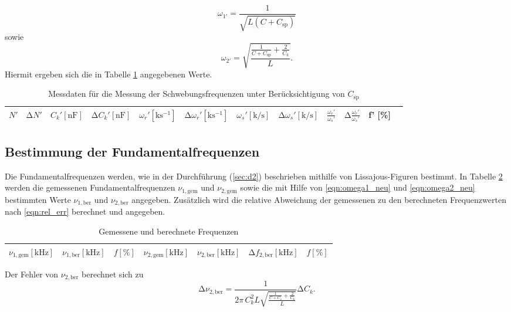 \begin{equation}
  \omega_{1'} = \frac{1}{\sqrt{L(C+C_{\text{sp}})}}
  \label{eqn:omega1_neu}
\end{equation}
sowie
\begin{equation}
  \omega_{2'} = \sqrt{\frac{ \frac{1}{C+C_{\text{sp}}} + \frac{2}{C_k} }{ L }}.
  \label{eqn:omega2_neu}
\end{equation}
Hiermit ergeben sich die in Tabelle \ref{tab:2} angegebenen Werte.
\begin{table}
  \centering
  \caption{Messdaten für die Messung der Schwebungsfrequenzen unter Berücksichtigung von $C_{\text{sp}}$}
  \label{tab:2}
  \begin{tabular}{c c c c c c c c c c c c}
    \toprule
    {$N'$} & {$\increment N' $} & {$ C_k' [\si{\nano\farad}] $} & {$\increment C_k' [\si{\nano\farad}] $} & {$ \omega_r' [\si{\kilo\second\tothe{-1}}] $} & {$\increment \omega_r' [\si{\kilo\second\tothe{-1}}] $} & {$ \omega_s' [\si{\kilo\per\second}] $} & {$\increment \omega_s' [\si{\kilo\per\second}] $} & {$\frac{\omega_r'}{\omega_s'}_{\text{}}$} & {$\increment \frac{\omega_r'}{\omega_s'}_{\text{}}$} & {f' [\%]} \\
    \midrule
    
    \bottomrule
  \end{tabular}
\end{table}

\subsection{Bestimmung der Fundamentalfrequenzen}

Die Fundamentalfrequenzen werden, wie in der Durchführung (\ref{sec:d2}) beschrieben mithilfe von Lissajous-Figuren bestimmt.
In Tabelle \ref{tab:3} werden die gemessenen Fundamentalfrequenzen $\nu_{1,\text{gem}}$ und $\nu_{2,\text{gem}}$ sowie die mit Hilfe von \eqref{eqn:omega1_neu} und \eqref{eqn:omega2_neu} bestimmten Werte $\nu_{1,\text{ber}}$ und $\nu_{2,\text{ber}}$ angegeben.
Zusätzlich wird die relative Abweichung der gemessenen zu den berechneten Frequenzwerten nach \eqref{eqn:rel_err} berechnet und angegeben.
\begin{table}[H]
  \centering
  \caption{Gemessene und berechnete Frequenzen}
  \label{tab:3}
  \begin{tabular}{c c c c c c c}
    \toprule
    {$\nu_{1,\text{gem}} [\si{\kilo\hertz}]$} & {$\nu_{1,\text{ber}} [\si{\kilo\hertz}]$} & {$f [\%]$} & {$\nu_{2,\text{gem}} [\si{\kilo\hertz}]$} & {$\nu_{2,\text{ber}} [\si{\kilo\hertz}]$} & {$\increment f_{2,\text{ber}} [\si{\kilo\hertz}]$} & {$f [\%]$} \\
    \midrule
    
    \bottomrule
  \end{tabular}
\end{table}
Der Fehler von $\nu_{2,\text{ber}}$ berechnet sich zu
\begin{equation}
\increment{\nu_{2,\text{ber}}} = \frac{1}{2 \pi\, C_k^2 L \sqrt{ \frac{\frac{1}{C+C_s} + \frac{2}{C_k}}{L} } } \increment{C_k}.
\end{equation}

